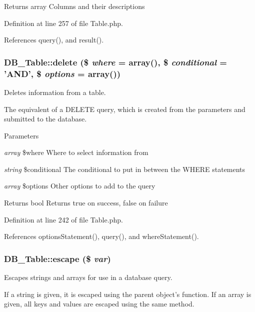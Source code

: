 \begin{DoxyReturn}{Returns}
array Columns and their descriptions 
\end{DoxyReturn}


Definition at line 257 of file Table.php.

References query(), and result().\hypertarget{classDB__Table_a2374e86114f0af3132e4df6d55301628}{
\subsubsection[{delete}]{\setlength{\rightskip}{0pt plus 5cm}DB\_\-Table::delete (\$ {\em where} = {\ttfamily array()}, \/  \$ {\em conditional} = {\ttfamily 'AND'}, \/  \$ {\em options} = {\ttfamily array()})}}
\label{d6/d90/classDB__Table_a2374e86114f0af3132e4df6d55301628}
Deletes information from a table.

The equivalent of a DELETE query, which is created from the parameters and submitted to the database.


\begin{DoxyParams}{Parameters}
\item[{\em array}]\$where Where to select information from \item[{\em string}]\$conditional The conditional to put in between the WHERE statements \item[{\em array}]\$options Other options to add to the query\end{DoxyParams}
\begin{DoxyReturn}{Returns}
bool Returns true on success, false on failure 
\end{DoxyReturn}


Definition at line 242 of file Table.php.

References optionsStatement(), query(), and whereStatement().\hypertarget{classDB__Table_a32f3e1b7ac33c40432f6204cc0af8b66}{
\subsubsection[{escape}]{\setlength{\rightskip}{0pt plus 5cm}DB\_\-Table::escape (\$ {\em var})}}
\label{d6/d90/classDB__Table_a32f3e1b7ac33c40432f6204cc0af8b66}
Escapes strings and arrays for use in a database query.

If a string is given, it is escaped using the parent object's function. If an array is given, all keys and values are escaped using the same method.


